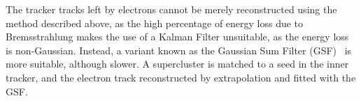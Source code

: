The tracker tracks left by electrons cannot be merely reconstructed using the method described above, as the high percentage of energy loss due to Bremsstrahlung makes the use of a Kalman Filter unsuitable, as the energy loss is non-Gaussian.  Instead, a variant known as the Gaussian Sum Filter (GSF)~\cite{gsf} is more suitable, although slower. A supercluster is matched to a seed in the inner tracker, and the electron track reconstructed by extrapolation and fitted with the GSF.  



